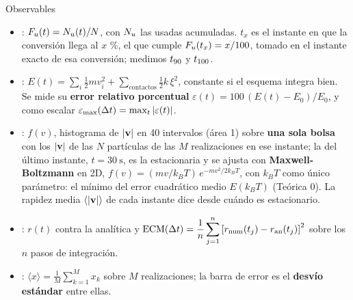 \documentclass[aspectratio=169,11pt]{beamer}
\begin{document}
\begin{frame}{Observables}
    \vspace{-0.3em}
    \footnotesize
    \begin{itemize}\setlength{\itemsep}{0.45em}
        \item {}: $F_u(t) = N_u(t)/N$, con $N_u$ las usadas
              acumuladas. \alert{$t_x$} es el instante en que la conversión llega
              al $x$ \%, el que cumple $F_u(t_x) = x/100$, tomado en el instante
              exacto de esa conversión; medimos $t_{90}$ y $t_{100}$.
        \item {}: $E(t) = \sum_{i} \tfrac{1}{2} m v_i^2
              + \sum_{\text{contactos}} \tfrac{1}{2} k\,\xi^2$, constante si el
              esquema integra bien. Se mide su \textbf{error relativo porcentual}
              $\varepsilon(t) = 100\,(E(t) - E_0)/E_0$, y como escalar
              $\varepsilon_{\max}(\Delta t) = \max_t |\varepsilon(t)|$.
        \item {}: $f(v)$, histograma
              de $|\mathbf{v}|$ en 40 intervalos (área 1) sobre \textbf{una sola bolsa}
              con los $|\mathbf{v}|$ de las $N$ partículas de las $M$ realizaciones en ese
              instante; la del último instante, $t = \SI{30}{\second}$, es la
              estacionaria y se ajusta con \textbf{Maxwell-Boltzmann} en 2D,
              $f(v) = (m v / k_BT)\,e^{-m v^2 / 2 k_BT}$, con $k_BT$ como único
              parámetro: el mínimo del error cuadrático medio $E(k_BT)$ (Teórica 0).
              La rapidez media $\langle |\mathbf{v}| \rangle$ de cada instante dice desde
              cuándo es estacionario.
        \item {}: $r(t)$ contra la analítica y
              $\displaystyle \mathrm{ECM}(\Delta t) = \frac{1}{n}
              \sum_{j=1}^{n}\left[r_{\text{num}}(t_j) - r_{\text{an}}(t_j)\right]^2$
              sobre los $n$ pasos de integración.
        \item {}: $\langle x \rangle = \frac{1}{M}\sum_{k=1}^{M} x_k$
              sobre $M$ realizaciones; la barra de error es el \textbf{desvío
              estándar} entre ellas.
    \end{itemize}
\end{frame}
\end{document}
